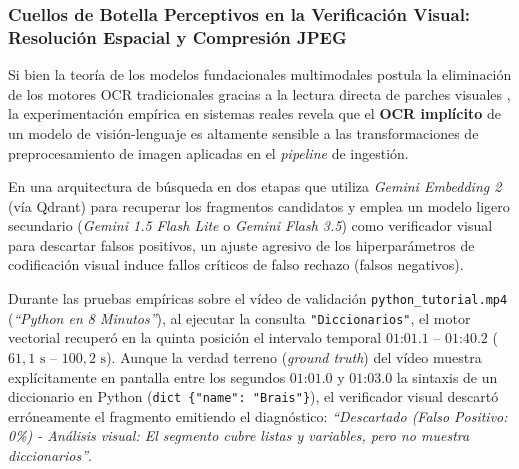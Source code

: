 \subsubsection{Cuellos de Botella Perceptivos en la Verificación Visual: Resolución Espacial y Compresión JPEG}
\label{subsubsec:cuellos_botella_perceptivos_ocr}

Si bien la teoría de los modelos fundacionales multimodales postula la eliminación de los motores OCR tradicionales gracias a la lectura directa de parches visuales \cite{prajwal2025multimodal}, la experimentación empírica en sistemas reales revela que el \textbf{OCR implícito} de un modelo de visión-lenguaje es altamente sensible a las transformaciones de preprocesamiento de imagen aplicadas en el \textit{pipeline} de ingestión. %

En una arquitectura de búsqueda en dos etapas que utiliza \textit{Gemini Embedding 2} (vía Qdrant) para recuperar los fragmentos candidatos y emplea un modelo ligero secundario (\textit{Gemini 1.5 Flash Lite} o \textit{Gemini Flash 3.5}) como verificador visual para descartar falsos positivos, un ajuste agresivo de los hiperparámetros de codificación visual induce fallos críticos de falso rechazo (falsos negativos). %

Durante las pruebas empíricas sobre el vídeo de validación \texttt{python\_tutorial.mp4} (\textit{``Python en 8 Minutos''}), al ejecutar la consulta \texttt{"Diccionarios"}, el motor vectorial recuperó en la quinta posición el intervalo temporal $01\text{:}01.1\text{ -- }01\text{:}40.2$ ($61,1\text{ s -- }100,2\text{ s}$). %
Aunque la verdad terreno (\textit{ground truth}) del vídeo muestra explícitamente en pantalla entre los segundos $01\text{:}01.0$ y $01\text{:}03.0$ la sintaxis de un diccionario en Python (\texttt{dict \{"name": "Brais"\}}), el verificador visual descartó erróneamente el fragmento emitiendo el diagnóstico: \textit{``Descartado (Falso Positivo: 0\%) - Análisis visual: El segmento cubre listas y variables, pero no muestra diccionarios''}. %


